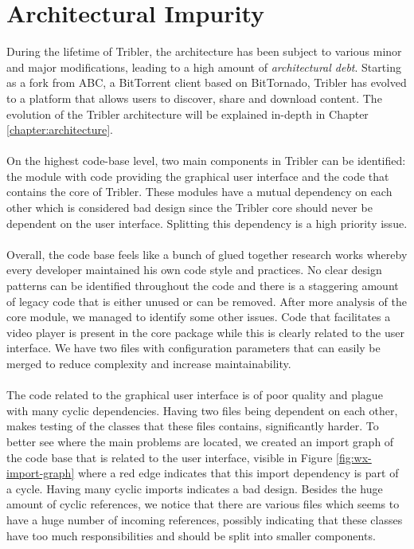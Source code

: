 \section{Architectural Impurity}
During the lifetime of Tribler, the architecture has been subject to various minor and major modifications, leading to a high amount of \emph{architectural debt}. Starting as a fork from ABC, a BitTorrent client based on BitTornado, Tribler has evolved to a platform that allows users to discover, share and download content. The evolution of the Tribler architecture will be explained in-depth in Chapter \ref{chapter:architecture}.\\\\
On the highest code-base level, two main components in Tribler can be identified: the module with code providing the graphical user interface and the code that contains the core of Tribler. These modules have a mutual dependency on each other which is considered bad design since the Tribler core should never be dependent on the user interface. Splitting this dependency is a high priority issue.\\\\
Overall, the code base feels like a bunch of glued together research works whereby every developer maintained his own code style and practices. No clear design patterns can be identified throughout the code and there is a staggering amount of legacy code that is either unused or can be removed. After more analysis of the core module, we managed to identify some other issues. Code that facilitates a video player is present in the core package while this is clearly related to the user interface. We have two files with configuration parameters that can easily be merged to reduce complexity and increase maintainability.\\\\
The code related to the graphical user interface is of poor quality and plague with many cyclic dependencies. Having two files being dependent on each other, makes testing of the classes that these files contains, significantly harder. To better see where the main problems are located, we created an import graph of the code base that is related to the user interface, visible in Figure \ref{fig:wx-import-graph} where a red edge indicates that this import dependency is part of a cycle. Having many cyclic imports indicates a bad design. Besides the huge amount of cyclic references, we notice that there are various files which seems to have a huge number of incoming references, possibly indicating that these classes have too much responsibilities and should be split into smaller components.\\

